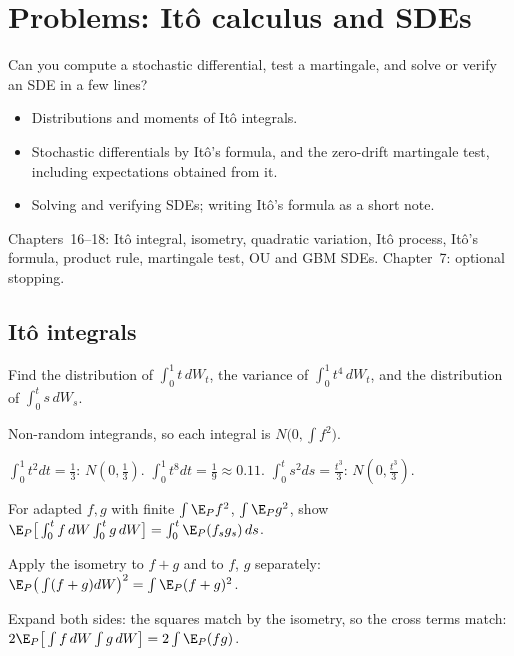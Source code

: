 \chapter{Problems: Itô calculus and SDEs}
\label{ch:prob-ito}

\begin{question}
Can you compute a stochastic differential, test a martingale, and solve or verify an SDE in a few lines?
\end{question}

\begin{whatfor}
\begin{itemize}
  \item Distributions and moments of Itô integrals.
  \item Stochastic differentials by Itô's formula, and the zero-drift martingale test, including expectations obtained from it.
  \item Solving and verifying SDEs; writing Itô's formula as a short note.
\end{itemize}
\end{whatfor}

\begin{prereq}
Chapters~16--18: Itô integral, isometry, quadratic variation, Itô process, Itô's formula, product rule, martingale test, OU and GBM SDEs. Chapter~7: optional stopping.
\end{prereq}

\section{Itô integrals}

\begin{problem}
Find the distribution of $\int_0^1t\,dW_t$, the variance of $\int_0^1t^4\,dW_t$, and the distribution of $\int_0^ts\,dW_s$.
\begin{steps}
  \item Non-random integrands, so each integral is $N\big(0,\int f^2\big)$.
  \item $\int_0^1t^2dt=\frac13$: $N(0,\frac13)$. $\int_0^1t^8dt=\frac19\approx0.11$. $\int_0^ts^2ds=\frac{t^3}3$: $N(0,\frac{t^3}3)$.
\end{steps}
\end{problem}

\begin{problem}
For adapted $f,g$ with finite $\int\E_Pf^2$, $\int\E_Pg^2$, show $\E_P\big[\int_0^tf\,dW\int_0^tg\,dW\big]=\int_0^t\E_P(f_sg_s)\,ds$.
\begin{steps}
  \item Apply the isometry to $f+g$ and to $f$, $g$ separately: $\E_P\big(\int(f+g)dW\big)^2=\int\E_P(f+g)^2$.
  \item Expand both sides: the squares match by the isometry, so the cross terms match: $2\E_P\big[\int f\,dW\int g\,dW\big]=2\int\E_P(fg)$.
\end{steps}
\end{problem}

